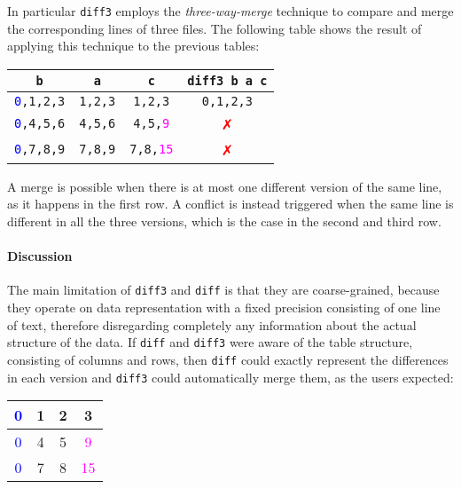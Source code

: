 \documentclass[preprint]{sigplanconf}
\theoremstyle{plain}
\begin{document}
In particular \texttt{diff3} employs the \emph{three-way-merge} technique to compare and merge the corresponding lines of three files. The following table shows the result of applying this technique to the previous tables:
\begin{center}
\begin{tabular}{| c | c | c | c |}
\hline
\texttt{b} & \texttt{a} & \texttt{c} & \texttt{diff3 b a c} \\ \hline
\texttt{\textcolor{blue}{0},1,2,3} & \texttt{1,2,3} & \texttt{1,2,3} & \textcolor{dgreen}{\texttt{0,1,2,3}} \\ \hline
\texttt{\textcolor{blue}{0},4,5,6} & \texttt{4,5,6} & \texttt{4,5,\textcolor{magenta}{9}} & \textcolor{red}{✗}  \\ \hline
\texttt{\textcolor{blue}{0},7,8,9} & \texttt{7,8,9} & \texttt{7,8,\textcolor{magenta}{15}} & \textcolor{red}{✗} \\ \hline
\end{tabular}
\end{center}
A merge is possible when there is at most one different version of the same line, as it happens in the first row.
A conflict is instead triggered when the same line is different in all the three versions, which is the case in the second and third row.


\paragraph{Discussion}
The main limitation of \texttt{diff3} and \texttt{diff} is that they are  coarse-grained, because they operate on data representation with a fixed precision consisting of one line of text, therefore disregarding completely any information about the actual structure of the data.
If \texttt{diff} and \texttt{diff3} were aware of the table structure, consisting of columns and rows, then \texttt{diff} could exactly represent the differences in each version and \texttt{diff3} could automatically merge them, as the users expected:
\begin{center}
\begin{tabular}{| c | c | c | c |}
\hline
\textcolor{blue}{0} & 1 & 2 & 3 \\ \hline
\textcolor{blue}{0} & 4 & 5 & \textcolor{magenta}{9} \\ \hline
\textcolor{blue}{0} & 7 & 8 & \textcolor{magenta}{15} \\ \hline
\end{tabular}
\end{center}
\end{document}
